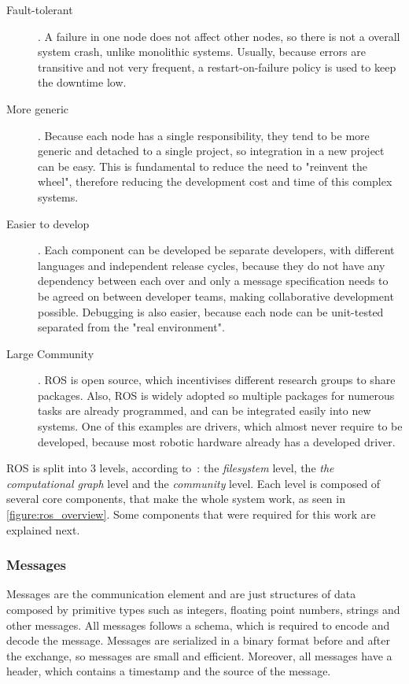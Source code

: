 \begin{description}
    \item[Fault-tolerant]. A failure in one node does not affect other nodes, so there is not a overall system crash, unlike monolithic systems. Usually, because errors are transitive and not very frequent, a restart-on-failure policy is used to keep the downtime low.
    \item[More generic]. Because each node has a single responsibility, they tend to be more generic and detached to a single project, so integration in a new project can be easy. This is fundamental to reduce the need to "reinvent the wheel", therefore reducing the development cost and time of this complex systems.
    \item[Easier to develop]. Each component can be developed be separate developers, with different languages and independent release cycles, because they do not have any dependency between each over and only a message specification needs to be agreed on between developer teams, making collaborative development possible. Debugging is also easier, because each node can be unit-tested separated from the "real environment".
    \item[Large Community]. ROS is open source, which incentivises different research groups to share packages. Also, ROS is widely adopted so multiple packages for numerous tasks are already programmed, and can be integrated easily into new systems. One of this examples are drivers, which almost never require to be developed, because most robotic hardware already has a developed driver.
\end{description}

ROS is split into 3 levels, according to~\cite{fernandez15}: the \textit{filesystem} level, the \textit{the computational graph} level and the \textit{community} level. Each level is composed of several core components, that make the whole system work, as seen in \cref{figure:ros_overview}. Some components that were required for this work are explained next.



\subsubsection{Messages}

Messages are the communication element and are just structures of data composed by primitive types such as integers, floating point numbers, strings and other messages. All messages follows a schema, which is required to encode and decode the message. Messages are serialized in a binary format before and after the exchange, so messages are small and efficient. Moreover, all messages have a header, which contains a timestamp and the source of the message. 

